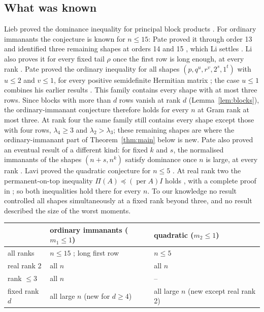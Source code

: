 \documentclass[11pt,a4paper]{article}
\theoremstyle{remark}
\newcommand{\per}{\operatorname{per}}
\begin{document}
\subsection{What was known}
Lieb proved the dominance inequality for principal block products \cite{Lieb}. For ordinary immanants the conjecture is known for $n\le15$: Pate proved it through order 13 and identified three remaining shapes at orders 14 and 15 \cite[Theorem~3 and the remarks after it]{Pate99}, which Li settles \cite[Theorem~1.8]{Li}. Li also proves it for every fixed tail $\rho$ once the first row is long enough, at every rank \cite[Theorem~1.3]{Li}. Pate proved the ordinary inequality for all shapes $(p,q^u,r^v,2^s,1^t)$ with $u\le2$ and $v\le1$, for every positive semidefinite Hermitian matrix \cite[Theorem~2]{Pate99}; the case $u\le1$ combines his earlier results \cite[Theorem~1]{Pate99}. This family contains every shape with at most three rows. Since blocks with more than $d$ rows vanish at rank $d$ (Lemma~\ref{lem:blocks}), the ordinary-immanant conjecture therefore holds for every $n$ at Gram rank at most three. At rank four the same family still contains every shape except those with four rows, $\lambda_4\ge3$ and $\lambda_2>\lambda_3$; these remaining shapes are where the ordinary-immanant part of Theorem~\ref{thm:main} below is new. Pate also proved an eventual result of a different kind: for fixed $k$ and $s$, the normalised immanants of the shapes $(n+s,n^k)$ satisfy dominance once $n$ is large, at every rank \cite[Theorem~4 and (1.2)]{Pate99}. Lavi proved the quadratic conjecture for $n\le5$ \cite[Theorem~4.1]{Lavi}. At real rank two the permanent-on-top inequality $\Pi(A)\preceq(\per A)I$ holds \cite{Liq}, with a complete proof in \cite[Appendix~A]{EPBS}; so both inequalities hold there for every $n$. To our knowledge no result controlled all shapes simultaneously at a fixed rank beyond three, and no result described the size of the worst moments.

\begin{center}\small
\begin{tabular}{lll}\toprule
 & ordinary immanants ($m_1\le1$) & quadratic ($m_2\le1$)\\\midrule
all ranks & $n\le15$ \cite{Li}; long first row \cite{Li} & $n\le5$ \cite{Lavi}\\
real rank 2 & all $n$ \cite{Liq,EPBS} & all $n$ \cite{Liq,EPBS}\\
rank $\le3$ & all $n$ \cite{Pate99} & --\\
fixed rank $d$ & all large $n$ (new for $d\ge4$) & all large $n$ (new except real rank 2)\\\bottomrule
\end{tabular}
\end{center}
\end{document}
